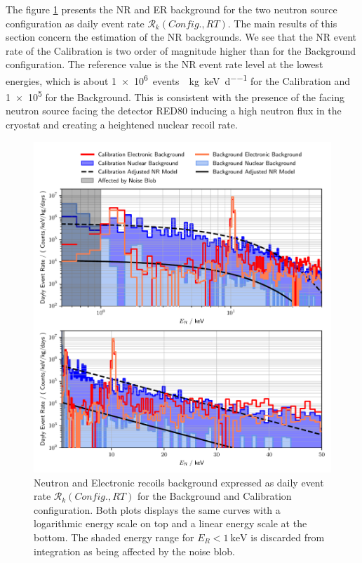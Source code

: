 The figure \ref{fig:background-measurements} presents the NR and ER background for the two neutron source configuration as daily event rate $\mathcal{R}_k(Config., RT)$. The main results of this section concern the estimation of the NR backgrounds. We see that the NR event rate of the Calibration is two order of magnitude higher than for the Background configuration. The reference value is the NR event rate level at the lowest energies, which is about \SI{1e6}{events \per \kg \per \kilo\eV \per \day} for the Calibration and \num{1e5} for the Background. This is consistent with the presence of the facing neutron source facing the detector RED80 inducing a high neutron flux in the cryostat and creating a heightened nuclear recoil rate. 

\begin{figure}
\centering
\includegraphics[scale=1]{Figures/Neutron/neutron_background.pdf}
\caption{Neutron and Electronic recoils background expressed as daily event rate $\mathcal{R}_k(Config., RT)$ for the Background and Calibration configuration. Both plots displays the same curves with a logarithmic energy scale on top and a linear energy scale at the bottom. The shaded energy range for $E_R< \SI{1}{\kilo\eV}$ is discarded from integration as being affected by the noise blob.}
\label{fig:background-measurements}
\end{figure}

